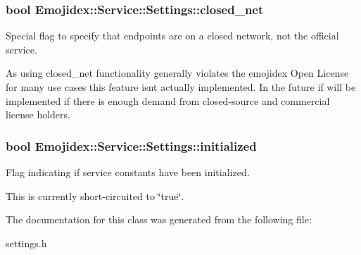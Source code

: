 \subsubsection[{\texorpdfstring{closed\+\_\+net}{closed_net}}]{\setlength{\rightskip}{0pt plus 5cm}bool Emojidex\+::\+Service\+::\+Settings\+::closed\+\_\+net\hspace{0.3cm}{\ttfamily [static]}}\hypertarget{classEmojidex_1_1Service_1_1Settings_a4794a14aa2dda9d5e238c4b4c289e77c}{}\label{classEmojidex_1_1Service_1_1Settings_a4794a14aa2dda9d5e238c4b4c289e77c}


Special flag to specify that endpoints are on a closed network, not the official service. 

As using closed\+\_\+net functionality generally violates the emojidex Open License for many use cases this feature isn\textquotesingle{}t actually implemented. In the future if will be implemented if there is enough demand from closed-\/source and commercial license holders. 
\subsubsection[{\texorpdfstring{initialized}{initialized}}]{\setlength{\rightskip}{0pt plus 5cm}bool Emojidex\+::\+Service\+::\+Settings\+::initialized\hspace{0.3cm}{\ttfamily [static]}}\hypertarget{classEmojidex_1_1Service_1_1Settings_af71baa4b94fd1dabfbcb0fef7e40e551}{}\label{classEmojidex_1_1Service_1_1Settings_af71baa4b94fd1dabfbcb0fef7e40e551}


Flag indicating if service constants have been initialized. 

This is currently short-\/circuited to \char`\"{}true\char`\"{}. 

The documentation for this class was generated from the following file\+:\begin{DoxyCompactItemize}
\item 
settings.\+h\end{DoxyCompactItemize}
